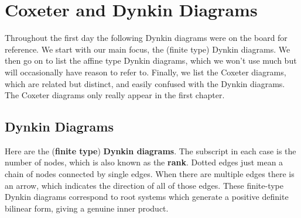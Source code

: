 \documentclass[fleqn, a4paper, openany]{memoir}
\newcommand{\define}[1]{\textbf{#1}}
\begin{document}
    \section{Coxeter and Dynkin Diagrams}
    Throughout the first day the following Dynkin diagrams were on the board for reference.
    We start with our main focus, the (finite type) Dynkin diagrams.
    We then go on to list the affine type Dynkin diagrams, which we won't use much but will occasionally have reason to refer to.
    Finally, we list the Coxeter diagrams, which are related but distinct, and easily confused with the Dynkin diagrams.
    The Coxeter diagrams only really appear in the first chapter.
    
    \subsection{Dynkin Diagrams}
    Here are the (\define{finite type}) \define{Dynkin diagrams}.
    The subscript in each case is the number of nodes, which is also known as the \define{rank}.
    Dotted edges just mean a chain of nodes connected by single edges.
    When there are multiple edges there is an arrow, which indicates the direction of all of those edges.
    These finite-type Dynkin diagrams correspond to root systems which generate a positive definite bilinear form, giving a genuine inner product.
    \begingroup
    \allowdisplaybreaks
\end{document}
